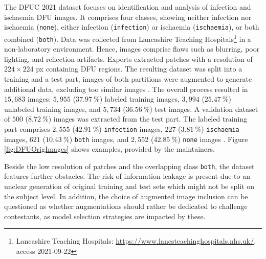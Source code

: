 \documentclass[runningheads]{llncs}
\begin{document}
The DFUC 2021 \cite{dfuc2021} dataset \cite{10.1109/BHI50953.2021.9508563} focuses on identification and analysis of infection and ischaemia DFU images. It comprises four classes, showing neither infection nor ischaemia (\texttt{none}), either infection (\texttt{infection}) or ischaemia (\texttt{ischaemia}), or both combined (\texttt{both}). Data was collected from Lancashire Teaching Hospitals\footnote{Lancashire Teaching Hospitals: \url{https://www.lancsteachinghospitals.nhs.uk/}, access 2021-09-22} in a non-laboratory environment. Hence, images comprise flaws such as blurring, poor lighting, and reflection artifacts. Experts extracted patches \cite{10.1109/BHI50953.2021.9508563} with a resolution of $224 \times 224$ px containing DFU regions. The resulting dataset was split into a training and a test part, images of both partitions were augmented to generate additional data, excluding too similar images \cite{10.1109/BHI50953.2021.9508563}. The overall process resulted in $15,683$ images: $5,955$ ($37.97~\%$) labeled training images, $3,994$ ($25.47~\%$) unlabeled training images, and $5,734$ ($36.56~\%$) test images. A validation dataset of $500$ ($8.72~\%$) images was extracted from the test part. The labeled training part comprises $2,555$ ($42.91~\%$) \texttt{infection} images, $227$ ($3.81~\%$) \texttt{ischaemia} images, $621$ ($10.43~\%$) \texttt{both} images, and $2,552$ ($42.85~\%$) \texttt{none} images \cite{10.1109/BHI50953.2021.9508563}. 
Figure \ref{fig:DFUOrigImages} shows examples, provided by the maintainers.

Beside the low resolution of patches and the overlapping class \texttt{both}, the dataset features further obstacles. The risk of information leakage is present due to an unclear generation of original training and test sets which might not be split on the subject level. In addition, the choice of augmented image inclusion can be questioned as whether augmentations should rather be dedicated to challenge contestants, as model selection strategies are impacted by these. 
\end{document}
